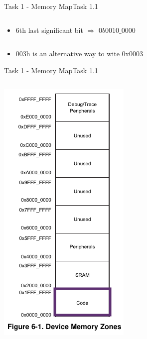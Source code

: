 {\begin{frame}[allowframebreaks]{Task 1 - Memory Map}{Task 1.1}
\begin{solution}
\begin{columns}
\begin{column}{0.6\paperwidth}
\begin{itemize}
          \item 6th last significant bit $\Rightarrow$ $0b0010\_0000$
        \end{itemize}
      \end{column}
    \end{columns}
  \end{solution}
  \begin{Sidenote}
    \begin{itemize}
      \item 003h is an alternative way to wite 0x0003
    \end{itemize}
  \end{Sidenote}
\end{frame}

\begin{frame}[allowframebreaks]{Task 1 - Memory Map}{Task 1.1\vspace{0.25cm}}
  \begin{solution}
    \begin{columns}
      \begin{column}{0.3\paperwidth}
        \centering
        \includegraphics[height=0.4\paperheight]{./figures/code.png}

\end{column}
\end{columns}
\end{solution}
\end{frame}}
